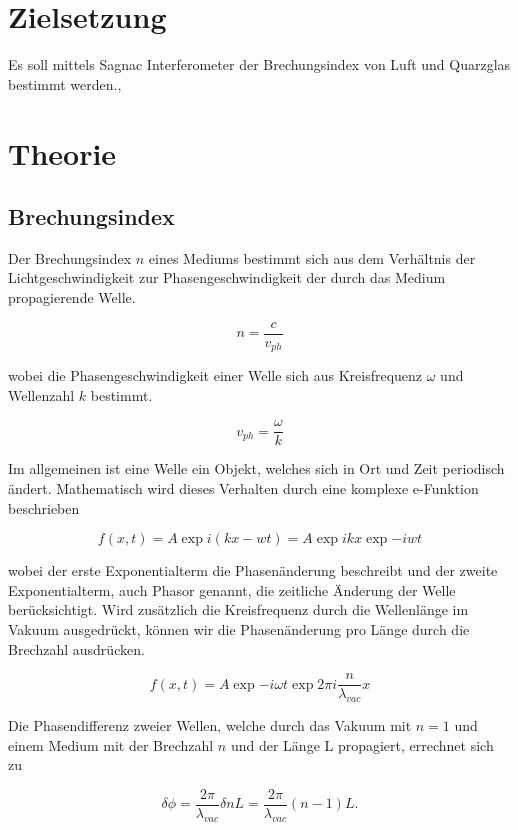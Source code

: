 \section{Zielsetzung}
Es soll mittels Sagnac Interferometer der Brechungsindex von Luft und Quarzglas bestimmt werden.,

\section{Theorie}
\subsection{Brechungsindex}
Der Brechungsindex $n$ eines Mediums bestimmt sich aus dem Verhältnis der Lichtgeschwindigkeit zur Phasengeschwindigkeit der durch das Medium
propagierende Welle.

\begin{equation}
n = \frac{c}{v_{ph}}
\end{equation}

wobei die Phasengeschwindigkeit einer Welle sich aus Kreisfrequenz $\omega$ und Wellenzahl $k$ bestimmt.

\begin{equation}
v_{ph} = \frac{\omega}{k}
\end{equation}

Im allgemeinen ist eine Welle ein Objekt, welches sich in Ort und Zeit periodisch ändert. Mathematisch wird dieses Verhalten durch eine komplexe
e-Funktion beschrieben

\begin{equation}
f(x, t) = A\exp{i(kx - wt)} = A \exp{ikx} \exp{-iwt}
\end{equation}

wobei der erste Exponentialterm die Phasenänderung beschreibt und der zweite Exponentialterm, auch Phasor genannt, die zeitliche Änderung der Welle berücksichtigt.
Wird zusätzlich die Kreisfrequenz durch die Wellenlänge im Vakuum ausgedrückt, können wir die Phasenänderung pro Länge durch die Brechzahl ausdrücken.

\begin{equation}
f(x, t) = A \exp{-i\omega t} \exp{2 \pi i \frac{n}{\lambda_{vac}} x}
\end{equation}

Die Phasendifferenz zweier Wellen, welche durch das Vakuum mit $n=1$ und einem Medium mit der Brechzahl $n$ und der Länge L propagiert, errechnet sich zu

\begin{equation}
\delta \phi = \frac{2 \pi}{\lambda_{vac}} \delta n L = \frac{2 \pi}{\lambda_{vac}} (n - 1)L.
\end{equation}


